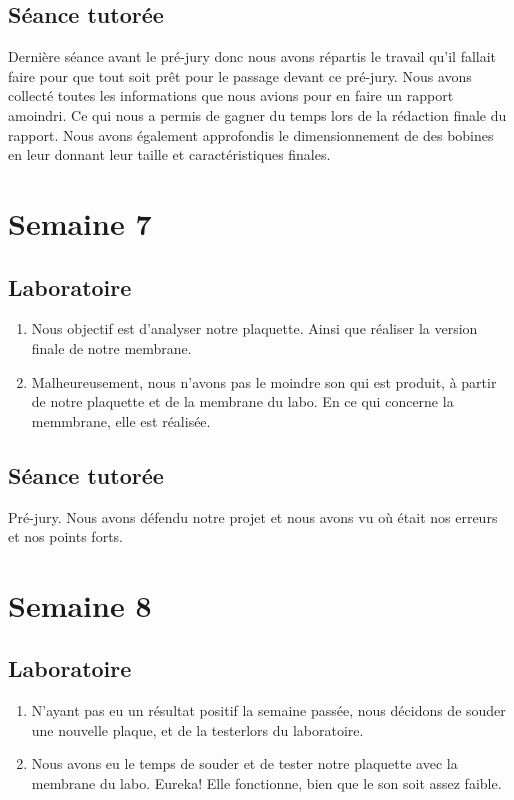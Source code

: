 \documentclass{article}
\begin{document}
\subsection{Séance tutorée}
Dernière séance avant le pré-jury donc nous avons répartis le travail qu’il fallait faire pour que tout soit prêt pour le passage devant ce pré-jury.  Nous avons collecté toutes les informations que nous avions pour en faire un rapport amoindri.   Ce qui nous a permis de gagner du temps lors de la rédaction finale du rapport.  Nous avons également approfondis le dimensionnement de des bobines en leur donnant leur taille et caractéristiques finales.

\section{Semaine 7}
\subsection{Laboratoire}
\begin{enumerate}
	\item Nous objectif est d'analyser notre plaquette. Ainsi que réaliser la version finale de notre
				membrane.
	\item Malheureusement, nous n'avons pas le moindre son qui est produit, à partir de notre plaquette et de la membrane du labo.
				En ce qui concerne la memmbrane, elle est réalisée. 
\end{enumerate}

\subsection{Séance tutorée}
Pré-jury.  Nous avons défendu notre projet et nous avons vu où était nos erreurs et nos points forts. 

\section{Semaine 8}
\subsection{Laboratoire}
\begin{enumerate}
	\item N'ayant pas eu un résultat positif la semaine passée, nous décidons de souder une nouvelle plaque, et de la testerlors du laboratoire.
	\item Nous avons eu le temps de souder et de tester notre plaquette avec la membrane du labo. 
				Eureka! Elle fonctionne, bien que le son soit assez faible.
\end{enumerate}
\end{document}
